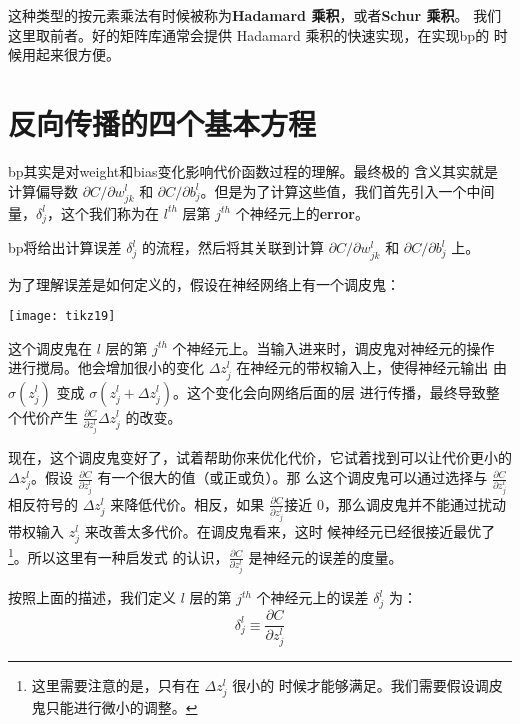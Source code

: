 这种类型的按元素乘法有时候被称为\textbf{Hadamard 乘积}，或者\textbf{Schur 乘积}。
我们这里取前者。好的矩阵库通常会提供 Hadamard 乘积的快速实现，在实现\gls*{bp}的
时候用起来很方便。

\section{反向传播的四个基本方程}
\label{sec:the_four_fundamental_equations_behind_backpropagation}

\gls*{bp}其实是对\gls*{weight}和\gls*{bias}变化影响代价函数过程的理解。最终极的
含义其实就是计算偏导数 $\partial C/\partial w_{jk}^l$ 和 $\partial C/\partial
b_j^l$。但是为了计算这些值，我们首先引入一个中间量，$\delta_j^l$，这个我们称为在
$l^{th}$ 层第 $j^{th}$ 个神经元上的\textbf{\gls{error}}。

\gls*{bp}将给出计算误差 $\delta_j^l$ 的流程，然后将其关联到计算 $\partial
C/\partial w_{jk}^l$ 和 $\partial C/\partial b_j^l$ 上。

为了理解误差是如何定义的，假设在神经网络上有一个调皮鬼：

\begin{center}
  \texttt{[image: tikz19]}
\end{center}

这个调皮鬼在 $l$ 层的第 $j^{th}$ 个神经元上。当输入进来时，调皮鬼对神经元的操作
进行搅局。他会增加很小的变化 $\Delta z_j^l$ 在神经元的带权输入上，使得神经元输出
由 $\sigma(z_j^l)$ 变成 $\sigma(z_j^l + \Delta z_j^l)$。这个变化会向网络后面的层
进行传播，最终导致整个代价产生 $\frac{\partial C}{\partial z_j^l} \Delta z_j^l$
的改变。

现在，这个调皮鬼变好了，试着帮助你来优化代价，它试着找到可以让代价更小的$\Delta
z_j^l$。假设 $\frac{\partial C}{\partial z_j^l}$ 有一个很大的值（或正或负）。那
么这个调皮鬼可以通过选择与 $\frac{\partial C}{\partial z_j^l}$ 相反符号的
$\Delta z_j^l$ 来降低代价。相反，如果 $\frac{\partial C}{\partial z_j^l}$接近
$0$，那么调皮鬼并不能通过扰动带权输入 $z_j^l$ 来改善太多代价。在调皮鬼看来，这时
候神经元已经很接近最优了\footnote{这里需要注意的是，只有在 $\Delta z_j^l$ 很小的
  时候才能够满足。我们需要假设调皮鬼只能进行微小的调整。}。所以这里有一种启发式
的认识，$\frac{\partial C}{\partial z_j^l}$ 是神经元的误差的度量。

按照上面的描述，我们定义 $l$ 层的第 $j^{th}$ 个神经元上的误差 $\delta_j^l$ 为：
\begin{equation}
  \delta^l_j \equiv \frac{\partial C}{\partial z^l_j}
  \label{eq:29}\tag{29}
\end{equation}


